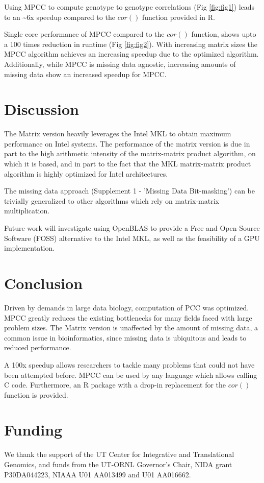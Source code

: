 \documentclass{bioinfo}
\begin{document}
Using MPCC to compute genotype to genotype correlations (Fig \ref{fig:fig1}) leads to 
an \textasciitilde{}6x speedup compared to the $cor()$ function provided in R.

Single core performance of MPCC compared to the $cor()$ function, shows upto a 
100 times reduction in runtime (Fig \ref{fig:fig2}). With increasing matrix sizes 
the MPCC algorithm achieves an increasing speedup due to the optimized algorithm. 
Additionally, while MPCC is missing data agnostic, increasing amounts of missing 
data show an increased speedup for MPCC.
\vspace*{-5mm}
\section{Discussion}
The Matrix version heavily leverages the Intel\textregistered{} MKL to obtain 
maximum performance on Intel\textregistered{} systems. The performance of the 
matrix version is due in part to the high arithmetic intensity of the 
matrix-matrix product algorithm, on which it is based, and in 
part to the fact that the MKL matrix-matrix product algorithm is highly 
optimized for Intel architectures.  

The missing data approach (Supplement 1 - 'Missing Data Bit-masking') can be 
trivially generalized to other algorithms which rely on matrix-matrix multiplication.

Future work will investigate using OpenBLAS to provide a Free and Open-Source 
Software (FOSS) alternative to the Intel\textregistered{} MKL, as well as the 
feasibility of a GPU implementation.
\vspace*{-5mm}
\section{Conclusion}
Driven by demands in large data biology, computation of PCC was optimized. 
MPCC greatly reduces the existing bottlenecks for many fields faced with 
large problem sizes. The Matrix version is unaffected by the amount of 
missing data, a common issue in bioinformatics, since missing data is 
ubiquitous and leads to reduced performance.

A 100x speedup allows researchers to tackle many problems that could 
not have been attempted before. MPCC can be used by any language which 
allows calling C code. Furthermore, an R package with a drop-in 
replacement for the $cor()$ function is provided.
\vspace*{-5mm}
\section*{Funding}
We thank the support of the UT Center for Integrative and Translational Genomics, 
and funds from the UT-ORNL Governor's Chair, NIDA grant P30DA044223, NIAAA U01 
AA013499 and U01 AA016662.
\vspace*{-5mm}


\end{document}
